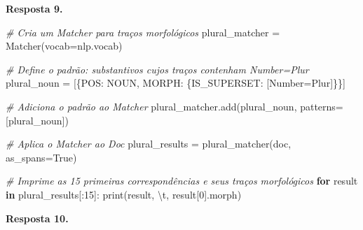 \documentclass[
  brazilian,
]{article}
\newenvironment{Shaded}{}{}
\newcommand{\BuiltInTok}[1]{#1}
\newcommand{\CharTok}[1]{\textcolor[rgb]{0.25,0.44,0.63}{#1}}
\newcommand{\CommentTok}[1]{\textcolor[rgb]{0.38,0.63,0.69}{\textit{#1}}}
\newcommand{\ControlFlowTok}[1]{\textcolor[rgb]{0.00,0.44,0.13}{\textbf{#1}}}
\newcommand{\DecValTok}[1]{\textcolor[rgb]{0.25,0.63,0.44}{#1}}
\newcommand{\KeywordTok}[1]{\textcolor[rgb]{0.00,0.44,0.13}{\textbf{#1}}}
\newcommand{\NormalTok}[1]{#1}
\newcommand{\OperatorTok}[1]{\textcolor[rgb]{0.40,0.40,0.40}{#1}}
\newcommand{\StringTok}[1]{\textcolor[rgb]{0.25,0.44,0.63}{#1}}
\newcommand{\VariableTok}[1]{\textcolor[rgb]{0.10,0.09,0.49}{#1}}
\begin{document}
\textbf{Resposta 9.}

\begin{Shaded}
\begin{Highlighting}[]
\CommentTok{\# Cria um Matcher para traços morfológicos}
\NormalTok{plural\_matcher }\OperatorTok{=}\NormalTok{ Matcher(vocab}\OperatorTok{=}\NormalTok{nlp.vocab)}

\CommentTok{\# Define o padrão: substantivos cujos traços contenham Number=Plur}
\NormalTok{plural\_noun }\OperatorTok{=}\NormalTok{ [\{}\StringTok{\textquotesingle{}POS\textquotesingle{}}\NormalTok{: }\StringTok{\textquotesingle{}NOUN\textquotesingle{}}\NormalTok{, }\StringTok{\textquotesingle{}MORPH\textquotesingle{}}\NormalTok{: \{}\StringTok{\textquotesingle{}IS\_SUPERSET\textquotesingle{}}\NormalTok{: [}\StringTok{\textquotesingle{}Number=Plur\textquotesingle{}}\NormalTok{]\}\}]}

\CommentTok{\# Adiciona o padrão ao Matcher}
\NormalTok{plural\_matcher.add(}\StringTok{\textquotesingle{}plural\_noun\textquotesingle{}}\NormalTok{, patterns}\OperatorTok{=}\NormalTok{[plural\_noun])}

\CommentTok{\# Aplica o Matcher ao Doc}
\NormalTok{plural\_results }\OperatorTok{=}\NormalTok{ plural\_matcher(doc, as\_spans}\OperatorTok{=}\VariableTok{True}\NormalTok{)}

\CommentTok{\# Imprime as 15 primeiras correspondências e seus traços morfológicos}
\ControlFlowTok{for}\NormalTok{ result }\KeywordTok{in}\NormalTok{ plural\_results[:}\DecValTok{15}\NormalTok{]:}
    \BuiltInTok{print}\NormalTok{(result, }\StringTok{\textquotesingle{}}\CharTok{\textbackslash{}t}\StringTok{\textquotesingle{}}\NormalTok{, result[}\DecValTok{0}\NormalTok{].morph)}
\end{Highlighting}
\end{Shaded}

\textbf{Resposta 10.}
\end{document}
